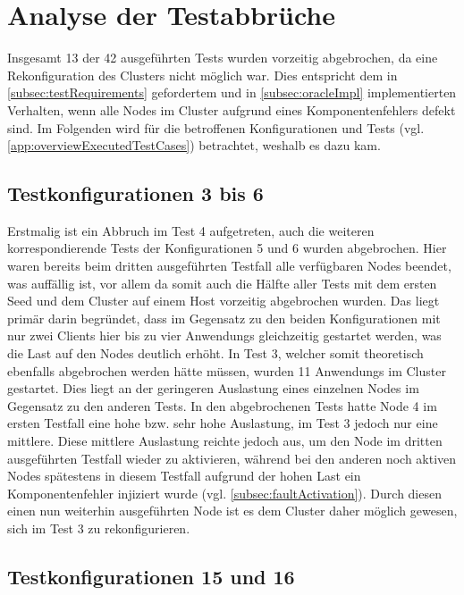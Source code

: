 \section{Analyse der Testabbrüche}
\label{sec:noReconfig}

Insgesamt 13 der 42 ausgeführten \glspl{Test} wurden vorzeitig abgebrochen, da eine Rekonfiguration des Clusters nicht möglich war.
Dies entspricht dem in \cref{subsec:testRequirements} gefordertem und in \cref{subsec:oracleImpl} implementierten Verhalten, wenn alle Nodes im Cluster aufgrund eines Komponentenfehlers defekt sind.
Im Folgenden wird für die betroffenen Konfigurationen und Tests (vgl. \cref{app:overviewExecutedTestCases}) betrachtet, weshalb es dazu kam.

\subsection{Testkonfigurationen 3 bis 6}
\label{subsec:noReconf36}

Erstmalig ist ein Abbruch im \gls{Test} 4 aufgetreten, auch die weiteren korrespondierende \glspl{Test} der Konfigurationen 5 und 6 wurden abgebrochen.
Hier waren bereits beim dritten ausgeführten \gls{Testfall} alle verfügbaren Nodes beendet, was auffällig ist, vor allem da somit auch die Hälfte aller \glspl{Test} mit dem ersten Seed und dem Cluster auf einem Host vorzeitig abgebrochen wurden.
Das liegt primär darin begründet, dass im Gegensatz zu den beiden Konfigurationen mit nur zwei Clients hier bis zu vier \glspl{Anwendung} gleichzeitig gestartet werden, was die Last auf den Nodes deutlich erhöht.
In \gls{Test} 3, welcher somit theoretisch ebenfalls abgebrochen werden hätte müssen, wurden 11 \glspl{Anwendung} im Cluster gestartet.
Dies liegt an der geringeren Auslastung eines einzelnen Nodes im Gegensatz zu den anderen Tests.
In den abgebrochenen \glspl{Test} hatte Node 4 im ersten \gls{Testfall} eine hohe bzw. sehr hohe Auslastung, im \gls{Test} 3 jedoch nur eine mittlere.
Diese mittlere Auslastung reichte jedoch aus, um den Node im dritten ausgeführten \gls{Testfall} wieder zu aktivieren, während bei den anderen noch aktiven Nodes spätestens in diesem \gls{Testfall} aufgrund der hohen Last ein Komponentenfehler injiziert wurde (vgl. \cref{subsec:faultActivation}).
Durch diesen einen nun weiterhin ausgeführten Node ist es dem Cluster daher möglich gewesen, sich im \gls{Test} 3 zu rekonfigurieren.

\subsection{Testkonfigurationen 15 und 16}
\label{subsec:noReconf1516}

